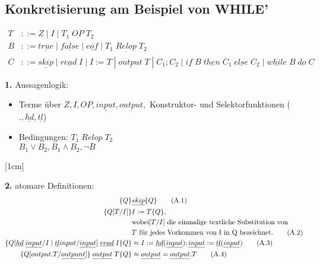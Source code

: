 \subsection{Konkretisierung am Beispiel von WHILE'}
\begin{align*}
T&::= Z\; |\; I\; |\; T_1\; \underline{OP}\; T_2\\
B&::= \underline{true}\; |\; \underline{false}\; |\; \underline{eof}\; |\; T_1\; \underline{Relop}\; T_2\\
C&::= \underline{skip}\; |\; \underline{read}\; I\; |\; I:=T\; |\; \underline{output}\; T\; |\; C_1;C_2\; |\; \underline{if}\;B\;\underline{then}\;C_1\;\underline{else}\;C_2\;|\;\underline{while}\;B\;\underline{do}\;C
\end{align*}
\begin{compactitem}
	\item[\textbf{1.}] Aussagenlogik:
	\begin{itemize}
		\item Terme über $Z, I, OP, \underline{input}, \underline{output},$ Konstruktor- und Selektorfunktionen ($., \underline{hd}, \underline{tl}$)
		\item Bedingungen: $T_1\;\underline{Relop}\;T_2$\\
		$B_1 \lor B_2, B_1 \land B_2, \lnot B$ 
	\end{itemize}
\newpage
{}[1cm]
	\item[\textbf{2.}] atomare Definitionen:\\
		\begin{align}
			\{Q\}&\underline{skip}\{Q\}\tag{A.1}\\
			\{Q[T/I]\}&I:=T\{Q\},\notag\\&\text{wobei}[T/I]\text{ die einmalige textliche Substitution von} \notag\\&T \text{ für jedes Vorkommen von I in Q bezeichnet.}\tag{A.2}\\
			\{Q[\underline{hd} \; \underline{input}/I\; |\; \underline{tl} input / \underline{input}]\;\underline{read}\; I \{Q\} &\approx I:= \underline{hd}(\underline{
			input}); \underline{input} := \underline{tl} (\underline{input}) \tag{A.3}\\
			\{Q[output.T / \underline{outpunt}]\}\;\underline{output}\;T \{Q\} &\approx \underline{output}=\underline{output}.T\tag{A.4}\\
			\notag
		\end{align}

\end{compactitem}
